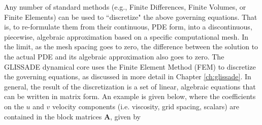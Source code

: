 %

Any number of standard methods (e.g., Finite Differences, Finite Volumes, or Finite Elements) can be used to ``discretize" the above governing equations. That is, to re-formulate them from their continuous, PDE form, into a discontinuous, piecewise, algebraic approximation based on a specific computational mesh. In the limit, as the mesh spacing goes to zero, the difference between the solution to the actual PDE and its algebraic approximation also goes to zero. The GLISSADE dynamical core uses the Finite Element Method (FEM) to discretize the governing equations, as discussed in more detail in Chapter \ref{ch:glissade}. In general, the result of the discretization is a set of linear, algebraic equations that can be written in matrix form. An example is given below, where the coefficients on the $u$ and $v$ velocity components (i.e. viscosity, grid spacing, scalars) are contained in the block matrices \textbf{A}, given by 


